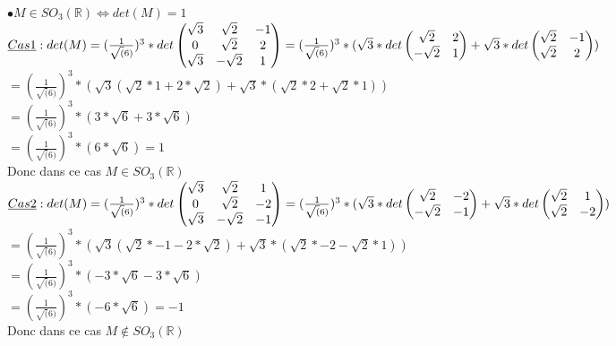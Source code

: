 \documentclass{article}
\begin{document}
$\bullet M \in SO_3(\mathbb{R}) \Leftrightarrow det(M) = 1$\\
$\underline{Cas 1}:\\
det(M) = (\frac{1}{\sqrt(6)})^3 * det
\begin{pmatrix}
    \sqrt{3} & \sqrt{2} & -1\\
    0 & \sqrt{2} & 2\\
    \sqrt{3} & -\sqrt{2} & 1\\
\end{pmatrix} = (\frac{1}{\sqrt(6)})^3 * (\sqrt{3} * det \begin{pmatrix}
    \sqrt{2} & 2\\
    -\sqrt{2} & 1\\
\end{pmatrix} + \sqrt{3} * det \begin{pmatrix}
    \sqrt{2} & - 1\\
    \sqrt{2} & 2\\
\end{pmatrix})$\\
$= (\frac{1}{\sqrt(6)})^3 * (\sqrt{3}(\sqrt{2}*1 + 2*\sqrt{2}) + \sqrt{3} * (\sqrt{2} * 2 + \sqrt{2} * 1))$\\
$= (\frac{1}{\sqrt(6)})^3 * (3 * \sqrt{6} + 3 * \sqrt{6})$\\
$= (\frac{1}{\sqrt(6)})^3 * (6 * \sqrt{6}) = 1$\\
Donc dans ce cas $M \in SO_3(\mathbb{R})$\\
\vspace*{5mm}
$\underline{Cas 2}:\\
det(M) = (\frac{1}{\sqrt(6)})^3 * det
\begin{pmatrix}
    \sqrt{3} & \sqrt{2} & 1\\
    0 & \sqrt{2} & -2\\
    \sqrt{3} & -\sqrt{2} & -1\\
\end{pmatrix} = (\frac{1}{\sqrt(6)})^3 * (\sqrt{3} * det \begin{pmatrix}
    \sqrt{2} & -2\\
    -\sqrt{2} & -1\\
\end{pmatrix} + \sqrt{3} * det \begin{pmatrix}
    \sqrt{2} & 1\\
    \sqrt{2} & -2\\
\end{pmatrix})\\$
$= (\frac{1}{\sqrt(6)})^3 * (\sqrt{3}(\sqrt{2}*-1 - 2*\sqrt{2}) + \sqrt{3} * (\sqrt{2} * -2 - \sqrt{2} * 1))$\\
$= (\frac{1}{\sqrt(6)})^3 * (-3 * \sqrt{6} - 3 * \sqrt{6})$\\
$= (\frac{1}{\sqrt(6)})^3 * (-6 * \sqrt{6}) = -1$\\
Donc dans ce cas $M \notin SO_3(\mathbb{R})$
\end{document}
